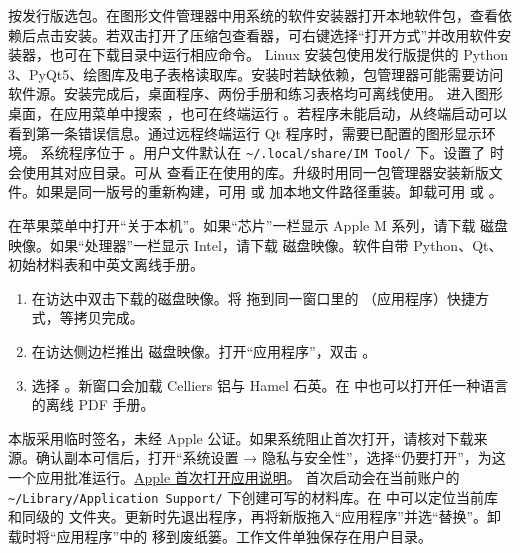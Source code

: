按发行版选包。在图形文件管理器中用系统的软件安装器打开本地软件包，查看依赖后点击安装。若双击打开了压缩包查看器，可右键选择“打开方式”并改用软件安装器，也可在下载目录中运行相应命令。
Linux 安装包使用发行版提供的 Python 3、PyQt5、绘图库及电子表格读取库。安装时若缺依赖，包管理器可能需要访问软件源。安装完成后，桌面程序、两份手册和练习表格均可离线使用。
进入图形桌面，在应用菜单中搜索 ，也可在终端运行 。若程序未能启动，从终端启动可以看到第一条错误信息。通过远程终端运行 Qt 程序时，需要已配置的图形显示环境。
系统程序位于 。用户文件默认在 \verb|~/.local/share/IM Tool/| 下。设置了  时会使用其对应目录。可从  查看正在使用的库。升级时用同一包管理器安装新版文件。如果是同一版号的重新构建，可用  或  加本地文件路径重装。卸载可用  或 。

在苹果菜单中打开“关于本机”。如果“芯片”一栏显示 Apple M 系列，请下载  磁盘映像。如果“处理器”一栏显示 Intel，请下载  磁盘映像。软件自带 Python、Qt、初始材料表和中英文离线手册。
\begin{enumerate}
\item 在访达中双击下载的磁盘映像。将  拖到同一窗口里的 （应用程序）快捷方式，等拷贝完成。
\item 在访达侧边栏推出  磁盘映像。打开“应用程序”，双击 。
\item 选择 。新窗口会加载 Celliers 铝与 Hamel 石英。在  中也可以打开任一种语言的离线 PDF 手册。
\end{enumerate}
本版采用临时签名，未经 Apple 公证。如果系统阻止首次打开，请核对下载来源。确认副本可信后，打开“系统设置 → 隐私与安全性”，选择“仍要打开”，为这一个应用批准运行。\href{https://support.apple.com/zh-cn/102445}{Apple 首次打开应用说明}。
首次启动会在当前账户的 \verb|~/Library/Application Support/| 下创建可写的材料库。在  中可以定位当前库和同级的  文件夹。更新时先退出程序，再将新版拖入“应用程序”并选“替换”。卸载时将“应用程序”中的  移到废纸篓。工作文件单独保存在用户目录。

